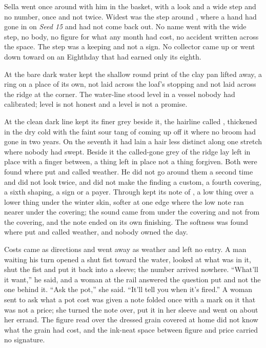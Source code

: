 \scenebreak

Sella went once around  with him in the basket, with a look and a wide step and no number, once and not twice. Widest was the step around , where a hand had gone in on \emph{Seed 15} and had not come back out. No name went with the wide step, no body, no figure for what any month had cost, no accident written across the space. The step was a keeping and not a sign. No collector came up or went down  toward  on an Eighthday that had earned only its eighth.

At  the bare dark water kept the shallow round print of the clay pan lifted away, a ring on a place of its own, not laid across the loaf's stopping and not laid across the ridge at the corner. The water-line stood level in a vessel nobody had calibrated; level is not honest and a level is not a promise.

At  the clean dark line kept its finer grey beside it, the hairline called , thickened in the dry cold with the faint sour tang of  coming up off it where no broom had gone in two years. On the seventh it had lain a hair less distinct along one stretch where nobody had swept. Beside it the called-gone grey of the ridge lay left in place with a finger between, a thing left in place not a thing forgiven. Both were found where put and called weather. He did not go around them a second time and did not look twice, and did not make the finding a custom, a fourth covering, a sixth shaping, a sign or a payer. Through   kept its note of , a low thing over a lower thing under the winter skin, softer at one edge where the low note ran nearer under the covering; the sound came from under the covering and not from the covering, and the note ended on its own finishing. The softness was found where put and called weather, and nobody owned the day.

Costs came as directions and went away as weather and left no entry. A man waiting his turn opened a shut fist toward the water, looked at what was in it, shut the fist and put it back into a sleeve; the number arrived nowhere. “What'll it want,” he said, and a woman at the rail answered the question put and not the one behind it. “Ask the pot,” she said. “It'll tell you when it's fired.” A woman sent to ask what a pot cost was given a note folded once with a mark on it that was not a price; she turned the note over, put it in her sleeve and went on about her errand. The figure read over the dressed grain covered at home did not know what the grain had cost, and the ink-neat space between figure and price carried no signature.

